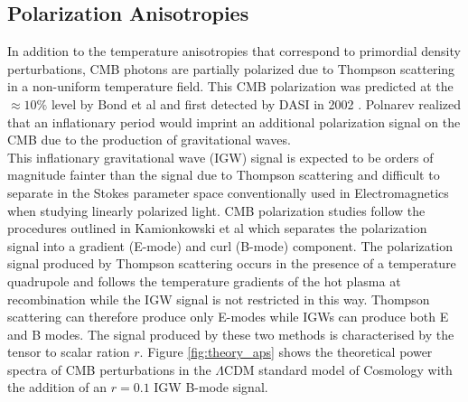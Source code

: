 \documentclass[12pt]{article}
\begin{document}
\subsection{Polarization Anisotropies}
\indent In addition to the temperature anisotropies that correspond to primordial
density perturbations, CMB photons are partially polarized due to Thompson
scattering in a non-uniform temperature field. This CMB polarization was predicted
at the $\approx 10\%$ level by Bond et al \cite{cite:Bond} and first detected
by DASI in 2002 \cite{cite:DASI}. Polnarev \cite{cite:Polnarev} realized that an inflationary
period would imprint an additional polarization signal on the CMB due to the
production of gravitational waves. \\
\indent This inflationary gravitational wave (IGW) signal is expected to be orders of
magnitude fainter than the signal due to Thompson scattering and difficult to
separate in the Stokes parameter space conventionally used in
Electromagnetics when studying linearly polarized light. CMB polarization
studies follow the procedures outlined in Kamionkowski et al
\cite{cite:Kamionkowski} which separates the polarization signal into a
gradient (E-mode) and curl (B-mode) component. The polarization signal
produced by Thompson scattering occurs in the presence of a temperature
quadrupole and follows the temperature gradients of the hot plasma at
recombination while the IGW signal is not restricted in this way. Thompson
scattering can therefore produce only E-modes while IGWs can produce both E
and B modes. The signal produced by these two methods is characterised by the
tensor to scalar ration $r$. Figure \ref{fig:theory_aps} shows the theoretical power spectra
of CMB perturbations in the $\Lambda$CDM standard model of Cosmology with the
addition of an $r=0.1$ IGW B-mode signal.
\end{document}
